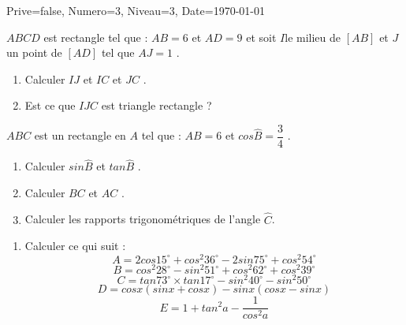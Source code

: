 \documentclass[a4paper,12pt]{article}
\begin{document}
\begin{Maquette}[DM]{Prive=false, Numero=3, Niveau=3, Date=\today}
\begin{exercice}
\end{exercice}


\begin{exercice}
$ABCD$ est rectangle tel que : $AB=6 $ et  $AD=9 $ et soit  $I$le milieu de $[AB]$ et $J$ un point de  $[AD]$ tel que $AJ=1 $ .
\begin{enumerate}
\item Calculer  $IJ$ et $IC$ et $JC$ .
\item Est ce que  $IJC$ est triangle rectangle ?
\end{enumerate}
\end{exercice}

\begin{exercice}
$ABC$ est un rectangle en $A$ tel que : $AB=6$ et $cos\widehat{B}=\dfrac{3}{4}$ .
\begin{enumerate}
\item Calculer $sin\widehat{B}$ et $tan\widehat{B}$ .
\item Calculer  $BC$ et $AC$ .
\item Calculer les rapports trigonométriques de l'angle  $ \widehat{C}$.
\end{enumerate}
\end{exercice}

\begin{exercice}
\begin{enumerate}
\item Calculer ce qui suit :
$$A=2cos15^{\circ}+cos^{2}36^{\circ}-2sin75^{\circ}+cos^{2}54^{\circ}$$
$$B=cos^{2}28^{\circ}-sin^{2}51^{\circ}+cos^{2}62^{\circ}+cos^{2}39^{\circ} $$
$$C=tan73^{\circ}\times tan17^{\circ}-sin^{2}40^{\circ}-sin^{2}50^{\circ} $$
$$D=cosx(sinx+cosx)-sinx(cosx-sinx)  $$ 
$$E= 1+tan^{2}a-\dfrac{1}{cos^{2}a}$$
\end{enumerate}
\end{exercice}
\end{Maquette}
\end{document}
